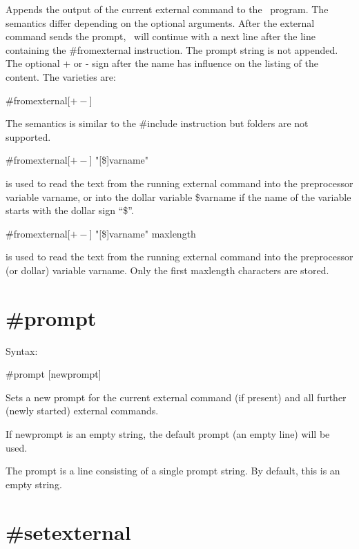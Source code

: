 \noindent Appends the output of the current 
external 
command to the \FORM\ program. The semantics differ depending on the optional 
arguments. After the external command sends the prompt, \FORM\ will continue 
with a next line after the line containing the \#fromexternal instruction. 
The prompt string is not appended. The optional + or - sign after the name 
has influence on the listing of the content. The varieties are:
                                                           
\#fromexternal[$+-$]

\noindent The semantics is similar to the \#include 
instruction but folders are not supported. 

\#fromexternal[$+-$] "[\$]varname"

\noindent is used to read the text from the running external command into 
the preprocessor variable varname, or into the dollar variable \$varname if 
the name of the variable starts with the dollar sign ``\$''.

\#fromexternal[$+-$] "[\$]varname" maxlength

\noindent is used to read the text from the running external command into 
the preprocessor (or dollar) variable varname. Only the first maxlength 
characters are stored.


\section{\#prompt}
\label{promptcommunication}

\noindent Syntax:

\#prompt [newprompt]

\noindent Sets a new prompt for the current external 
command (if present) and all further (newly started) external commands.

If newprompt is an empty string, the default prompt (an empty line) will be 
used.

The prompt is a line consisting of a single prompt string. By default, this 
is an empty string.


\section{\#setexternal}
\label{setexternalcommunication}

